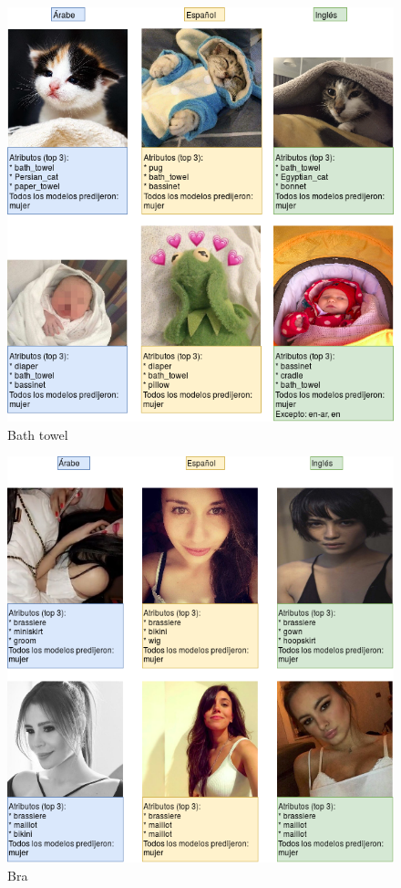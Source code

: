 \documentclass[runningheads]{llncs}
\begin{document}
\begin{figure}
    \centering
    \includegraphics[scale=0.37]{img/best_gi/bath_towel_gi.png}
    \caption{Bath towel}
    \label{fig:towel}
\end{figure}
\begin{figure}
    \centering
    \includegraphics[scale=0.37]{img/best_gi/brassiere_gi.png}
    \caption{Bra}
    \label{fig:brassiere}
\end{figure}
\end{document}
